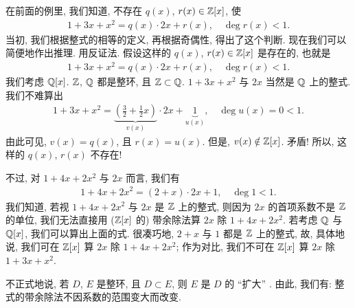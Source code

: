 在前面的例里, 我们知道, 不存在 $q(x)$, $r(x) \in \mathbb{Z}[x]$, 使
\begin{align*}
    1 + 3x + x^2 = q(x) \cdot 2x + r(x), \quad \deg r(x) < 1.
\end{align*}
当初, 我们根据整式的相等的定义, 再根据奇偶性, 得出了这个判断. 现在我们可以简便地作出推理. 用反证法. 假设这样的 $q(x)$, $r(x) \in \mathbb{Z}[x]$ 是存在的, 也就是
\begin{align*}
    1 + 3x + x^2 = q(x) \cdot 2x + r(x), \quad \deg r(x) < 1.
\end{align*}
我们考虑 $\mathbb{Q}[x]$. $\mathbb{Z}$, $\mathbb{Q}$ 都是整环, 且 $\mathbb{Z} \subset \mathbb{Q}$. $1+3x+x^2$ 与 $2x$ 当然是 $\mathbb{Q}$ 上的整式. 我们不难算出
\begin{align*}
    1 + 3x + x^2 = {\underbrace{\left( \frac{3}{2} + \frac{1}{2}x \right)}_{v(x)}} \cdot 2x + \underbrace{1}_{u(x)}, \quad \deg u(x) = 0 < 1.
\end{align*}
由此可见, $v(x) = q(x)$, 且 $r(x) = u(x)$. 但是, $v(x) \notin \mathbb{Z}[x]$. 矛盾! 所以, 这样的 $q(x)$, $r(x)$ 不存在!

不过, 对 $1 + 4x + 2x^2$ 与 $2x$ 而言, 我们有
\begin{align*}
    1 + 4x + 2x^2 = (2 + x) \cdot 2x + 1, \quad \deg 1 < 1.
\end{align*}
我们知道, 若视 $1 + 4x + 2x^2$ 与 $2x$ 是 $\mathbb{Z}$ 上的整式, 则因为 $2x$ 的首项系数不是 $\mathbb{Z}$ 的单位, 我们无法直接用 ($\mathbb{Z}[x]$ 的) 带余除法算 $2x$ 除 $1 + 4x + 2x^2$. 若考虑 $\mathbb{Q}$ 与 $\mathbb{Q}[x]$, 我们可以算出上面的式. 很凑巧地, $2 + x$ 与 $1$ 都是 $\mathbb{Z}$ 上的整式, 故, 具体地说, 我们可在 $\mathbb{Z}[x]$ 算 $2x$ 除 $1 + 4x + 2x^2$; 作为对比, 我们不可在 $\mathbb{Z}[x]$ 算 $2x$ 除 $1 + 3x + x^2$.

不正式地说, 若 $D$, $E$ 是整环, 且 $D \subset E$, 则 $E$ 是 $D$ 的 ``扩大'' . 由此, 我们有: 整式的带余除法不因系数的范围变大而改变.
